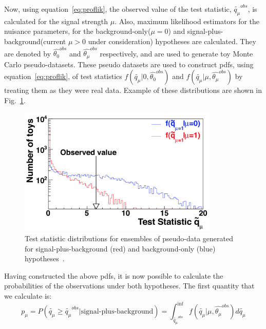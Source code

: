 Now, using equation~\ref{eq:proflik}, the observed value of the test statistic, $\tilde{q_\mu}^{obs}$, is calculated for the signal strength $\mu$. Also, maximum likelihood estimators for the nuisance parameters, for the background-only($\mu=0$) and signal-plus-background(current $\mu>0$ under consideration) hypotheses are calculated. They are denoted by $\hat{\theta_{0}}^{obs}$ and $\hat{\theta_\mu}^{obs}$ respectively, and are used to generate toy Monte Carlo pseudo-datasets. These pseudo datasets are used to construct  pdfs, using equation~\ref{eq:proflik}, of test statistics $f(\tilde{q_\mu}|0,\hat{\theta_{0}}^{obs})$ and $f(\tilde{q_\mu}|\mu,\hat{\theta_\mu}^{obs})$ by treating them as they were real data. Example of these distributions are shown in Fig.~\ref{fig:test_stat_dist}.
\begin{figure}[!htpb]\centering
  \captionsetup{width=.87\textwidth}
 \includegraphics[width=0.85\textwidth]{plots_and_figures/chapter7/test_statistic_distri.png}
 \caption{Test statistic distributions for ensembles of pseudo-data generated for signal-plus-background (red) and background-only (blue) hypotheses~\cite{note2011}.}
 \label{fig:test_stat_dist}
\end{figure}


Having constructed the above pdfs, it is now possible to calculate the probabilities of the observations under both hypotheses. The first quantity that we calculate is:
\begin{equation}                                                                                                                                                                                                 \label{eq:pmu}                                                       p_\mu=P(\tilde{q_\mu}\geq \tilde{q_\mu}^{obs}|\text{signal-plus-background})=\int_{\tilde{q_\mu}^{obs}}^{\inf}f(\tilde{q_\mu}|\mu,\hat{\theta_\mu}^{obs})d\tilde{q_\mu}
\end{equation}

